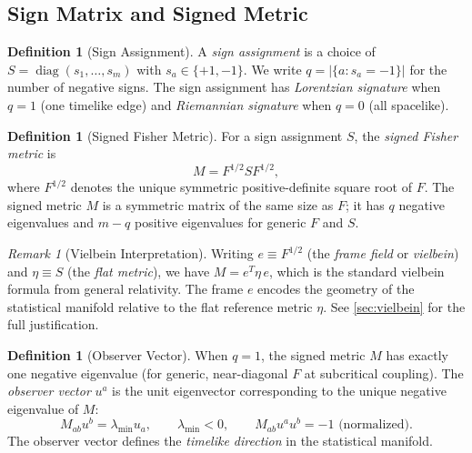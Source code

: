\documentclass[11pt]{article}
\theoremstyle{definition}
\newtheorem{definition}[theorem]{Definition}
\theoremstyle{remark}
\newtheorem{remark}[theorem]{Remark}
\newcommand{\Fish}{F}
\newcommand{\sgn}{S}
\newcommand{\Met}{M}
\newcommand{\obs}{u}
\newcommand{\diag}{\operatorname{diag}}
\begin{document}
\subsection{Sign Matrix and Signed Metric}

\begin{definition}[Sign Assignment]
\label{def:sign}
A \emph{sign assignment} is a choice of $\sgn = \diag(s_1, \ldots, s_m)$
with $s_a \in \{+1, -1\}$. We write $q = |\{a : s_a = -1\}|$ for the
number of negative signs. The sign assignment has \emph{Lorentzian signature}
when $q = 1$ (one timelike edge) and \emph{Riemannian signature} when
$q = 0$ (all spacelike).
\end{definition}

\begin{definition}[Signed Fisher Metric]
\label{def:signed-metric}
For a sign assignment $\sgn$, the \emph{signed Fisher metric} is
\begin{equation}
  \Met = \Fish^{1/2} \sgn \Fish^{1/2},
  \label{eq:signed-metric-def}
\end{equation}
where $\Fish^{1/2}$ denotes the unique symmetric positive-definite
square root of $\Fish$. The signed metric $\Met$ is a symmetric matrix
of the same size as $\Fish$; it has $q$ negative eigenvalues and $m - q$
positive eigenvalues for generic $\Fish$ and $\sgn$.
\end{definition}

\begin{remark}[Vielbein Interpretation]
\label{rem:vielbein}
Writing $e \equiv \Fish^{1/2}$ (the \emph{frame field} or \emph{vielbein})
and $\eta \equiv \sgn$ (the \emph{flat metric}), we have
$\Met = e^T \eta\, e$, which is the standard vielbein formula from
general relativity. The frame $e$ encodes the geometry of the statistical
manifold relative to the flat reference metric $\eta$.
See \cref{sec:vielbein} for the full justification.
\end{remark}

\begin{definition}[Observer Vector]
\label{def:observer-vector}
When $q = 1$, the signed metric $\Met$ has exactly one negative eigenvalue
(for generic, near-diagonal $\Fish$ at subcritical coupling). The
\emph{observer vector} $\obs^a$ is the unit eigenvector corresponding to
the unique negative eigenvalue of $\Met$:
\begin{equation}
  \Met_{ab} \obs^b = \lambda_{\min} \obs_a, \qquad \lambda_{\min} < 0,
  \qquad \Met_{ab} \obs^a \obs^b = -1 \text{ (normalized)}.
  \label{eq:observer-def}
\end{equation}
The observer vector defines the \emph{timelike direction} in the
statistical manifold.
\end{definition}
\end{document}
